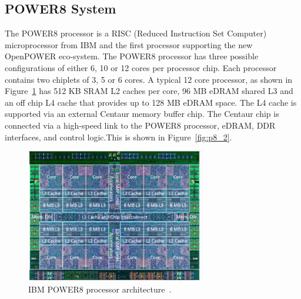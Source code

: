 
\subsection{POWER8 System}

The POWER8 processor is a RISC (Reduced Instruction Set Computer) microprocessor from IBM and the first processor supporting the new OpenPOWER eco-system. 
The POWER8 processor has three possible configurations of either 6, 10 or 12 cores per processor chip. Each processor contains two chiplets of 3, 5 or 6 cores.  A typical 12 core processor, as shown in Figure~\ref{fig:p8_1} has  512 KB SRAM L2 caches per core, 96 MB eDRAM shared L3 and an off chip L4 cache that provides up to 128 MB eDRAM space. The L4 cache is supported via an external Centaur memory buffer chip. The Centaur chip is connected via a high-speed link to the POWER8 processor, eDRAM, DDR interfaces, and control logic.This is shown in Figure~\ref{fig:p8_2}. 

\begin{figure}[h!]
  \centering
  \includegraphics[height=0.4\textwidth, width=0.7\textwidth]{./Images/P8.pdf}
       \caption{IBM POWER8 processor architecture~\cite{IBM_P8}.}
       \label{fig:p8_1}
\end{figure}

